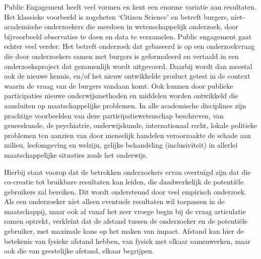 \documentclass[empirical, authordate, ]{new-jote-article}
\begin{document}
	Public Engagement heeft veel vormen en kent een enorme variatie aan resultaten. Het klassieke voorbeeld is zogeheten ‘Citizen Science' en betreft burgers, niet-academische onderzoekers die meedoen in wetenschappelijk onderzoek, door bijvoorbeeld observaties te doen en data te verzamelen. Public engagement gaat echter veel verder. Het betreft onderzoek dat gebaseerd is op een onderzoekvraag die door onderzoekers samen met burgers is geformuleerd en vertaald in een onderzoeksproject dat gezamenlijk wordt uitgevoerd. Daarbij wordt dan meestal ook de nieuwe kennis, en/of het nieuw ontwikkelde product getest in de context waarin de vraag van de burgers vandaan komt. Ook kunnen door publieke participaties nieuwe onderwijsmethoden en middelen worden ontwikkeld die aansluiten op maatschappelijke problemen. In alle academische disciplines zijn prachtige voorbeelden van deze participatiewetenschap beschreven, van geneeskunde, de psychiatrie, onderwijskunde, internationaal recht, lokale politieke problemen ten aanzien van door menselijk handelen veroorzaakte de schade aan milieu, leefomgeving en welzijn, gelijke behandeling (inclusiviteit) in allerlei maatschappelijke situaties zoals het onderwijs.



	Hierbij staat voorop dat de betrokken onderzoekers ervan overtuigd zijn dat die co-creatie tot bruikbare resultaten kan leiden, die daadwerkelijk de potentiële gebruikers zal bereiken. Dit wordt ondersteund door veel empirisch onderzoek. Als een onderzoeker niet alleen eventuele resultaten wil toepassen in de maatschappij, maar ook al vanaf het zeer vroege begin bij de vraag articulatie samen optrekt, verkleint dat de afstand tussen de onderzoeker en de potentiële gebruiker, met maximale kans op het maken van impact. Afstand kan hier de betekenis van fysieke afstand hebben, van fysiek met elkaar samenwerken, maar ook die van geestelijke afstand, elkaar begrijpen.
\end{document}
